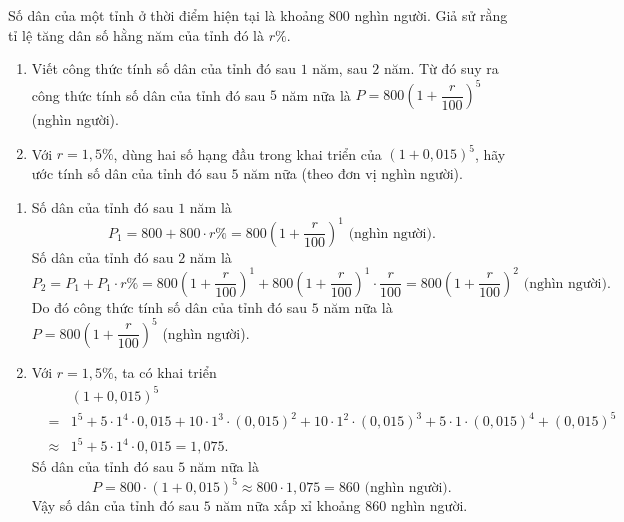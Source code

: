 \begin{bt}%
	Số dân của một tỉnh ở thời điểm hiện tại là khoảng $800$ nghìn người. Giả sử rằng tỉ lệ tăng dân số hằng năm của tỉnh đó là $r\%$.
	\begin{enumerate}
		\item Viết công thức tính số dân của tỉnh đó sau $1$ năm, sau $2$ năm. Từ đó suy ra công thức tính số dân của tỉnh đó sau $5$ năm nữa là $P=800\left (1+\dfrac{r}{100} \right )^5$ (nghìn người).
		\item Với $r=1{,}5\%$, dùng hai số hạng đầu trong khai triển của $\left (1+0{,}015 \right )^5$, hãy ước tính số dân của tỉnh đó sau $5$ năm nữa (theo đơn vị nghìn người).
	\end{enumerate}
	\loigiai
	{
		\begin{enumerate}
			\item Số dân của tỉnh đó sau $1$ năm là
			$$P_1=800+800\cdot r\%=800\left (1+\dfrac{r}{100} \right )^1\text{ (nghìn người)}.$$
			Số dân của tỉnh đó sau $2$ năm là $$P_2=P_1+P_1\cdot r\%=800\left (1+\dfrac{r}{100} \right )^1+800\left (1+\dfrac{r}{100} \right )^1\cdot\dfrac{r}{100}=800\left (1+\dfrac{r}{100} \right )^2\text{ (nghìn người)}.$$
			Do đó công thức tính số dân của tỉnh đó sau $5$ năm nữa là $P=800\left (1+\dfrac{r}{100} \right )^5$ (nghìn người).
			\item Với $r=1{,}5\%$, ta có khai triển
			\begin{eqnarray*}
				&&(1+0{,}015)^5\\&=&1^5+5\cdot 1^4\cdot 0{,}015+10\cdot 1^3\cdot (0{,}015)^2+10\cdot 1^2\cdot (0{,}015)^3+5\cdot 1\cdot (0{,}015)^4+(0{,}015)^5\\&\approx &1^5+5\cdot 1^4\cdot 0{,}015=1{,}075.
			\end{eqnarray*}
			Số dân của tỉnh đó sau $5$ năm nữa là $$P=800\cdot (1+0{,}015)^5\approx 800\cdot 1{,}075=860\text{ (nghìn người)}.$$
			Vậy số dân của tỉnh đó sau $5$ năm nữa xấp xỉ khoảng $860$ nghìn người.
		\end{enumerate}
	}
\end{bt}
